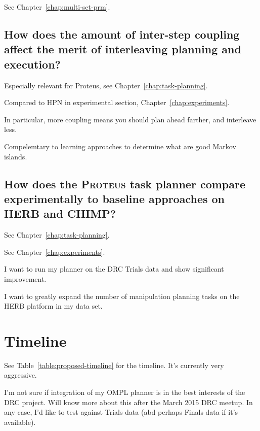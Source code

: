 {See Chapter~\ref{chap:multi-set-prm}.

\subsection{How does the amount of inter-step coupling
   affect the merit of interleaving planning and execution?}
\label{ques:how-sequence}

Especially relevant for Proteus,
see Chapter~\ref{chap:task-planning}.

Compared to HPN
in experimental section, Chapter~\ref{chap:experiments}.

In particular,
more coupling means you should plan ahead farther,
and interleave less.

Compelemtary to learning approaches
to determine what are good Markov islands.

\subsection{How does the \textsc{Proteus} task planner
   compare experimentally to baseline approaches
   on \textsc{HERB} and \textsc{CHIMP}?}
\label{ques:drc-compare}

See Chapter~\ref{chap:task-planning}.

See Chapter~\ref{chap:experiments}.

I want to run my planner on the DRC Trials data
and show significant improvement.

I want to greatly expand the number of manipulation planning tasks
on the HERB platform in my data set.


}%

\section{Timeline}

See Table~\ref{table:proposed-timeline} for the timeline.
It's currently very aggressive.

I'm not sure if integration of my OMPL planner
is in the best interests of the DRC project.
Will know more about this after the March 2015 DRC meetup.
In any case, I'd like to test against Trials data
(abd perhaps Finals data if it's available).

